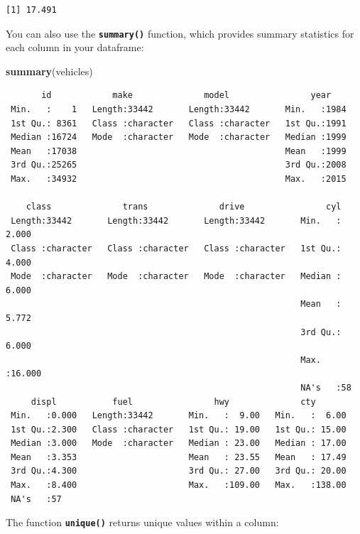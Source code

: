 \documentclass[
]{book}
\newenvironment{Shaded}{\begin{snugshade}}{\end{snugshade}}
\newcommand{\KeywordTok}[1]{\textcolor[rgb]{0.13,0.29,0.53}{\textbf{#1}}}
\newcommand{\NormalTok}[1]{#1}
\begin{document}
\begin{verbatim}
[1] 17.491
\end{verbatim}

You can also use the \textbf{\texttt{summary()}} function, which provides summary statistics for each column in your dataframe:

\begin{Shaded}
\begin{Highlighting}[]
\KeywordTok{summary}\NormalTok{(vehicles)}
\end{Highlighting}
\end{Shaded}

\begin{verbatim}
       id            make              model                year     
 Min.   :    1   Length:33442       Length:33442       Min.   :1984  
 1st Qu.: 8361   Class :character   Class :character   1st Qu.:1991  
 Median :16724   Mode  :character   Mode  :character   Median :1999  
 Mean   :17038                                         Mean   :1999  
 3rd Qu.:25265                                         3rd Qu.:2008  
 Max.   :34932                                         Max.   :2015  
                                                                     
    class              trans              drive                cyl        
 Length:33442       Length:33442       Length:33442       Min.   : 2.000  
 Class :character   Class :character   Class :character   1st Qu.: 4.000  
 Mode  :character   Mode  :character   Mode  :character   Median : 6.000  
                                                          Mean   : 5.772  
                                                          3rd Qu.: 6.000  
                                                          Max.   :16.000  
                                                          NA's   :58      
     displ           fuel                hwy              cty        
 Min.   :0.000   Length:33442       Min.   :  9.00   Min.   :  6.00  
 1st Qu.:2.300   Class :character   1st Qu.: 19.00   1st Qu.: 15.00  
 Median :3.000   Mode  :character   Median : 23.00   Median : 17.00  
 Mean   :3.353                      Mean   : 23.55   Mean   : 17.49  
 3rd Qu.:4.300                      3rd Qu.: 27.00   3rd Qu.: 20.00  
 Max.   :8.400                      Max.   :109.00   Max.   :138.00  
 NA's   :57                                                          
\end{verbatim}

The function \textbf{\texttt{unique()}} returns unique values within a column:
\end{document}
